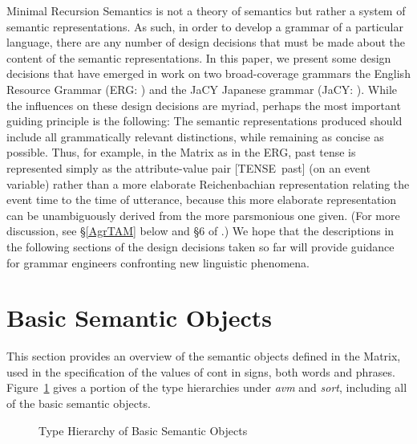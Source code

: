 \documentclass[12pt]{article}
\begin{document}
Minimal Recursion Semantics is not a theory of semantics but rather a
system of semantic representations.  As such, in order to develop a
grammar of a particular language, there are any number of design
decisions that must be made about the content of the semantic
representations.  In this paper, we present some design decisions that
have emerged in work on two broad-coverage grammars the English
Resource Grammar (ERG: ) and the JaCY Japanese
grammar (JaCY: ).
While the influences on these design decisions
are myriad, perhaps the most important guiding principle is the
following: The semantic representations produced should include all
grammatically relevant distinctions, while remaining as concise as
possible.  Thus, for example, in the Matrix as in the ERG, past tense
is represented simply as the attribute-value pair \mbox{[TENSE past]}
(on an event variable) rather than a more elaborate Reichenbachian
representation relating the event time to the time of utterance,
because this more elaborate representation can be unambiguously
derived from the more parsmonious one given.  (For more discussion,
see \S\ref{AgrTAM} below and {\S}6 of .)
We hope that the descriptions in the following sections of the design
decisions taken so far will provide guidance for grammar engineers
confronting new linguistic phenomena.

\section{Basic Semantic Objects}
\label{basicobj}

This section provides an overview of the semantic objects defined in the
Matrix, used in the specification of the values of {\sc cont} in signs, both
words and phrases.  Figure~\ref{mrsobj} gives a portion of the type hierarchies
under {\it avm} and {\it sort}, including all of the basic semantic objects.

\begin{figure}[ht]
\begin{center}
{\it\small
\begin{tree}
\end{tree}
}
\end{center}
\caption{Type Hierarchy of Basic Semantic Objects}
\label{mrsobj}
\end{figure}
\end{document}
